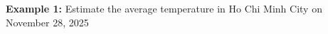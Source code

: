 \documentclass[preview]{standalone}
\begin{document}
\begin{center}
\textbf{Example 1:} Estimate the average temperature in Ho Chi Minh City on November 28, 2025\\
\end{center}
\end{document}
